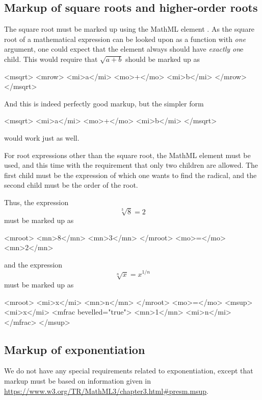 \documentclass[english,a4paper,11pt]{article}
\begin{document}
\subsection{Markup of square roots and higher-order roots}
The square root must be marked up using the MathML element . As the square root of a mathematical expression can be looked upon as a function with \emph{one} argument, one could expect that the  element always should have \emph{exactly on}e child.
This would require that $\sqrt{a + b}$ should be marked up as
\begin{kodeblokk}
\begin{verbatimtab}[3]
<msqrt>
	<mrow>
		<mi>a</mi>
		<mo>+</mo>
		<mi>b</mi>
	</mrow>
</msqrt>
\end{verbatimtab}
\end{kodeblokk}
And this is indeed perfectly good markup, but the simpler form
\begin{kodeblokk}
\begin{verbatimtab}[3]
<msqrt>
	<mi>a</mi>
	<mo>+</mo>
	<mi>b</mi>
</msqrt>
\end{verbatimtab}
\end{kodeblokk}
would work just as well.

\bigskip For root expressions other than the square root, the MathML element  must be used, and this time with the requirement that only two children are allowed. The first child must be the expression of which one wants to find the radical, and the second child must be the order of the root.

Thus, the expression \[\sqrt[3]{8} =2\]
must be marked up as
\begin{kodeblokk}
\begin{verbatimtab}[3]
<mroot>
	<mn>8</mn>
	<mn>3</mn>
</mroot>
<mo>=</mo>
<mn>2</mn>
\end{verbatimtab}
\end{kodeblokk}
and the expression \[\sqrt[n]{x}=x^{1/n} \]
must be marked up as
\begin{kodeblokk}
\begin{verbatimtab}[3]
<mroot>
	<mi>x</mi>
	<mn>n</mn>
</mroot>
<mo>=</mo>
<msup>
	<mi>x</mi>
	<mfrac bevelled="true">
		<mn>1</mn>
		<mi>n</mi>
	</mfrac>
</msup>
\end{verbatimtab}
\end{kodeblokk}

\subsection{Markup of exponentiation}
We do not have any special requirements related to exponentiation, except that markup must be based on information given in \url{https://www.w3.org/TR/MathML3/chapter3.html#presm.msup}.
\end{document}
